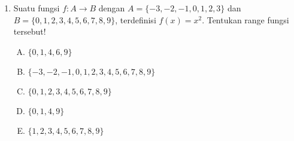 \documentclass[fleqn, a4paper, 12pt]{article} %
\begin{document}
	\begin{enumerate}
		\item Suatu fungsi $f: A \rightarrow B$ dengan $A = \{-3, -2, -1, 0, 1, 2, 3\}$ dan $B = \{0, 1, 2, 3, 4, 5, 6, 7, 8, 9\}$, terdefinisi $f(x) = x^2$. Tentukan range fungsi tersebut!
			\begin{enumerate}[(A)]
				\item $\{0, 1, 4, 6, 9\}$
				\item $\{-3, -2, -1, 0, 1, 2, 3, 4, 5, 6, 7, 8, 9\}$
				\item $\{0, 1, 2, 3, 4, 5, 6, 7, 8, 9\}$
				\item $\{0, 1, 4, 9\}$
				\item $\{1, 2, 3, 4, 5, 6, 7, 8, 9\}$
			\end{enumerate}
		
		\newpage
		

\end{enumerate}
\end{document}
